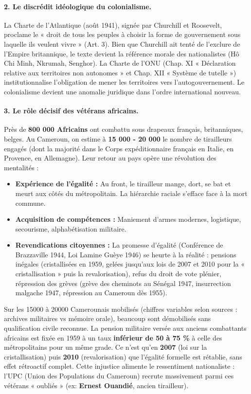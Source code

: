 \documentclass[11pt]{article}
\newcommand{\cle}[1]{{\popxbold\color{popdark}#1}}
\begin{document}
\paragraph{2. Le discrédit idéologique du colonialisme.} La Charte de l'Atlantique (août 1941), signée par Churchill et Roosevelt, proclame le « droit de tous les peuples à choisir la forme de gouvernement sous laquelle ils veulent vivre » (Art. 3). Bien que Churchill ait tenté de l'exclure de l'Empire britannique, le texte devient la référence morale des nationalistes (Hô Chi Minh, Nkrumah, Senghor). La Charte de l'ONU (Chap. XI « Déclaration relative aux territoires non autonomes » et Chap. XII « Système de tutelle ») institutionnalise l'obligation de mener les territoires vers l'autogouvernement. Le colonialisme devient une anomalie juridique dans l'ordre international nouveau.

\paragraph{3. Le rôle décisif des vétérans africains.} Près de \textbf{800 000 Africains} ont combattu sous drapeaux français, britanniques, belges. Au Cameroun, on estime à \textbf{15 000 - 20 000} le nombre de tirailleurs engagés (dont la majorité dans le Corps expéditionnaire français en Italie, en Provence, en Allemagne). Leur retour au pays opère une \cle{révolution des mentalités} :
\begin{itemize}
    \item \textbf{Expérience de l'égalité :} Au front, le tirailleur mange, dort, se bat et meurt aux côtés du métropolitain. La hiérarchie raciale s'efface face à la mort commune.
    \item \textbf{Acquisition de compétences :} Maniement d'armes modernes, logistique, secourisme, alphabétisation militaire.
    \item \textbf{Revendications citoyennes :} La promesse d'égalité (Conférence de Brazzaville 1944, Loi Lamine Guèye 1946) se heurte à la réalité : pensions inégales (cristallisées en 1959, gelées jusqu'aux lois de 2007 et 2010 pour la « cristallisation » puis la revalorisation), refus du droit de vote plénier, répression des grèves (grève des cheminots au Sénégal 1947, insurrection malgache 1947, répression au Cameroun dès 1955).
\end{itemize}

\begin{exemplebox}
Sur les \num{15000} à \num{20000} Camerounais mobilisés (chiffres variables selon sources : archives militaires vs mémoire orale), beaucoup sont démobilisés sans qualification civile reconnue. La \cle{pension militaire} versée aux anciens combattants africains est fixée en 1959 à un taux \textbf{inférieur de 50 à 75 \%} à celle des métropolitains pour un même grade. Ce n'est qu'en \textbf{2007} (loi sur la cristallisation) puis \textbf{2010} (revalorisation) que l'égalité formelle est rétablie, sans effet rétroactif complet. Cette injustice alimente le ressentiment nationaliste : l'UPC (Union des Populations du Cameroun) recrute massivement parmi ces vétérans « oubliés » (ex: \textbf{Ernest Ouandié}, ancien tirailleur).
\end{exemplebox}
\end{document}
